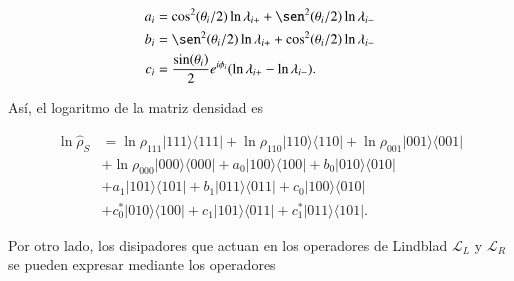 \begin{appendixs}
\begin{align*}
    a_{i} & = \cos^{2}(\theta_{i}/2) \ln \lambda_{i+} + \sen^{2}(\theta_{i}/2) \ln \lambda_{i-} \\
    b_{i} & = \sen^{2}(\theta_{i}/2) \ln \lambda_{i+} + \cos^{2}(\theta_{i}/2) \ln \lambda_{i-}  \\
    c_{i} & = \frac{\sin(\theta_{i})}{2}e^{i\phi_{i}} (\ln \lambda_{i+} - \ln \lambda_{i-}).    
\end{align*}

Así, el logaritmo de la matriz densidad es 

\begin{align*}
    \ln \hat{\rho}_{S} & = \ln \rho_{111}|111\rangle \langle 111| + \ln \rho_{110}|110\rangle \langle 110| + \ln \rho_{001}|001\rangle \langle 001| \\ 
     & + \ln \rho_{000}|000\rangle \langle 000| + a_{0}|100\rangle \langle 100| + b_{0}|010\rangle \langle 010|  \\  
     & + a_{1}|101\rangle \langle 101| + b_{1}|011\rangle\langle 011| + c_{0}|100\rangle \langle 010| \\ 
     & + c^{*}_{0}|010\rangle \langle 100| + c_{1}|101\rangle \langle 011| + c^{*}_{1}|011\rangle \langle 101|.
\end{align*}

Por otro lado, los disipadores que actuan en los operadores de Lindblad $\mathcal{L}_{L}$ y $\mathcal{L}_{R}$ se pueden expresar mediante los operadores 


\end{appendixs}
